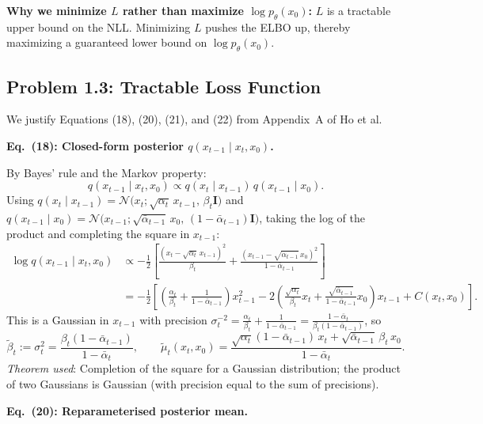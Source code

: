 \documentclass[11pt]{article}
\newcommand{\N}{\mathcal{N}}
\newcommand{\abar}{\bar{\alpha}}
\begin{document}
\textbf{Why we minimize $L$ rather than maximize $\log p_\theta(x_0)$:} $L$ is a
tractable upper bound on the NLL. Minimizing $L$ pushes the ELBO up, thereby
maximizing a guaranteed lower bound on $\log p_\theta(x_0)$.

\subsection{Problem 1.3: Tractable Loss Function}

We justify Equations (18), (20), (21), and (22) from Appendix~A of Ho et al.

\textbf{Eq.~(18): Closed-form posterior $q(x_{t-1}\mid x_t,x_0)$.}

By Bayes' rule and the Markov property:
\begin{equation}
q(x_{t-1}\mid x_t,x_0) \propto q(x_t\mid x_{t-1})\,q(x_{t-1}\mid x_0).
\end{equation}
Using
$q(x_t\mid x_{t-1}) = \N\!\bigl(x_t;\sqrt{\alpha_t}\,x_{t-1},\,\beta_t\mathbf{I}\bigr)$
and
$q(x_{t-1}\mid x_0) = \N\!\bigl(x_{t-1};\sqrt{\abar_{t-1}}\,x_0,\,(1-\abar_{t-1})\mathbf{I}\bigr)$,
taking the log of the product and completing the square in $x_{t-1}$:
\begin{align*}
\log q(x_{t-1}\mid x_t,x_0)
&\propto
  -\tfrac{1}{2}\!\left[
    \frac{(x_t - \sqrt{\alpha_t}\,x_{t-1})^2}{\beta_t}
    + \frac{(x_{t-1} - \sqrt{\abar_{t-1}}\,x_0)^2}{1-\abar_{t-1}}
  \right]\\
&= -\tfrac{1}{2}\!\left[
    \left(\frac{\alpha_t}{\beta_t}+\frac{1}{1-\abar_{t-1}}\right)x_{t-1}^2
    - 2\!\left(\frac{\sqrt{\alpha_t}}{\beta_t}x_t
              +\frac{\sqrt{\abar_{t-1}}}{1-\abar_{t-1}}x_0\right)x_{t-1}
    + C(x_t,x_0)
  \right].
\end{align*}
This is a Gaussian in $x_{t-1}$ with precision
$\sigma_{t}^{-2} = \frac{\alpha_t}{\beta_t}+\frac{1}{1-\abar_{t-1}}
= \frac{1-\abar_t}{\beta_t(1-\abar_{t-1})}$,
so
\begin{equation}
\tilde\beta_t := \sigma_{t}^2
= \frac{\beta_t(1-\abar_{t-1})}{1-\abar_t},
\qquad
\tilde\mu_t(x_t,x_0)
= \frac{\sqrt{\alpha_t}(1-\abar_{t-1})\,x_t + \sqrt{\abar_{t-1}}\,\beta_t\,x_0}{1-\abar_t}.
\tag{18}
\end{equation}
\textit{Theorem used}: Completion of the square for a Gaussian distribution; the product of two Gaussians is Gaussian (with precision equal to the sum of precisions).

\textbf{Eq.~(20): Reparameterised posterior mean.}
\end{document}
